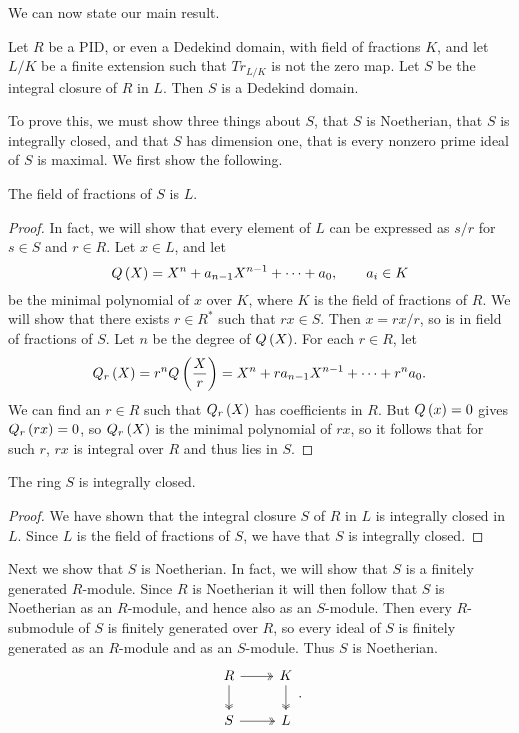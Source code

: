 We can now state our main result.

\begin{theorem}
Let $ R $ be a PID, or even a Dedekind domain, with field of fractions $ K $, and let $ L / K $ be a finite extension such that $ Tr_{L / K} $ is not the zero map. Let $ S $ be the integral closure of $ R $ in $ L $. Then $ S $ is a Dedekind domain.
\end{theorem}

To prove this, we must show three things about $ S $, that $ S $ is Noetherian, that $ S $ is integrally closed, and that $ S $ has dimension one, that is every nonzero prime ideal of $ S $ is maximal. We first show the following.

\begin{lemma}
The field of fractions of $ S $ is $ L $.
\end{lemma}

\begin{proof}
In fact, we will show that every element of $ L $ can be expressed as $ s / r $ for $ s \in S $ and $ r \in R $. Let $ x \in L $, and let
$$ Q\left( X \right) = X^n + a_{n - 1}X^{n - 1} + \dots + a_0, \qquad a_i \in K $$
be the minimal polynomial of $ x $ over $ K $, where $ K $ is the field of fractions of $ R $. We will show that there exists $ r \in R^* $ such that $ rx \in S $. Then $ x = rx / r $, so is in field of fractions of $ S $. Let $ n $ be the degree of $ Q\left( X \right) $. For each $ r \in R $, let
$$ Q_r\left( X \right) = r^nQ\left( \dfrac{X}{r} \right) = X^n + ra_{n - 1}X^{n - 1} + \dots + r^na_0. $$
We can find an $ r \in R $ such that $ Q_r\left( X \right) $ has coefficients in $ R $. But $ Q\left( x \right) = 0 $ gives $ Q_r\left( rx \right) = 0 $, so $ Q_r\left( X \right) $ is the minimal polynomial of $ rx $, so it follows that for such $ r $, $ rx $ is integral over $ R $ and thus lies in $ S $.
\end{proof}

\begin{corollary}
The ring $ S $ is integrally closed.
\end{corollary}

\begin{proof}
We have shown that the integral closure $ S $ of $ R $ in $ L $ is integrally closed in $ L $. Since $ L $ is the field of fractions of $ S $, we have that $ S $ is integrally closed.
\end{proof}

Next we show that $ S $ is Noetherian. In fact, we will show that $ S $ is a finitely generated $ R $-module. Since $ R $ is Noetherian it will then follow that $ S $ is Noetherian as an $ R $-module, and hence also as an $ S $-module. Then every $ R $-submodule of $ S $ is finitely generated over $ R $, so every ideal of $ S $ is finitely generated as an $ R $-module and as an $ S $-module. Thus $ S $ is Noetherian.
$$
\begin{tikzcd}
R \arrow[twoheadrightarrow]{r} \arrow[twoheadrightarrow]{d} & K \arrow[twoheadrightarrow]{d} \\
S \arrow[twoheadrightarrow]{r} & L
\end{tikzcd}.
$$

